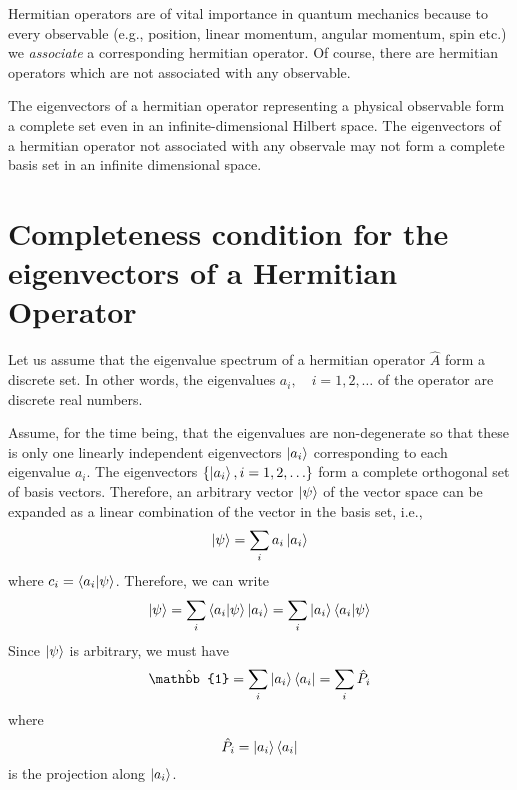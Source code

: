 	
	Hermitian operators are of vital importance in quantum mechanics because to every observable (e.g., position, linear momentum, angular momentum, spin etc.) we \textit{associate} a corresponding hermitian operator. Of course, there are hermitian operators which are not associated with any observable.
	
	
	The eigenvectors of a hermitian operator representing a physical observable form a complete set even in an infinite-dimensional Hilbert space. The eigenvectors of a hermitian operator not associated with any observale may not form a complete basis set in an infinite dimensional space.
	
	
	
	\section{Completeness condition for the eigenvectors of a Hermitian Operator}
	Let us assume that the eigenvalue spectrum of a hermitian operator $\hat{A}$ form a discrete set. In other words, the eigenvalues $a_i,\quad i=1,2,\ldots$ of the operator are discrete real numbers.
	
	Assume, for the time being, that the eigenvalues are non-degenerate so that these is only one linearly independent eigenvectors $\ket{a_i}$ corresponding to each eigenvalue $a_i$. The eigenvectors $\{\ket{a_i}, i=1,2,\ldots\}$ form a complete orthogonal set of basis vectors. Therefore, an arbitrary vector $\ket{\psi}$ of the vector space can be expanded as a linear combination of the vector in the basis set, i.e.,
	\begin{equation}
		\ket{\psi} = \sum_{i} a_i \ket{a_i}
	\end{equation}
	where $c_i = \braket{a_i}{\psi}$. Therefore, we can write
	\begin{equation}
		\ket{\psi} = \sum_i \braket{a_i}{\psi} \ket{a_i} = \sum_i \ket{a_i}\braket{a_i}{\psi}
	\end{equation}
	Since $\ket{\psi}$ is arbitrary, we must have
	\begin{equation}
		\hat{\mathbb{1}} = \sum_i \ket{a_i}\bra{a_i} = \sum_i \hat{P}_i
		\label{chapter5.eqn1-completeness}
	\end{equation}
	where
	\begin{equation}
		\hat{P}_i = \ket{a_i}\bra{a_i}
		\label{chapter5.eqn2-projection}
	\end{equation}
	is the projection along $\ket{a_i}$.
	
